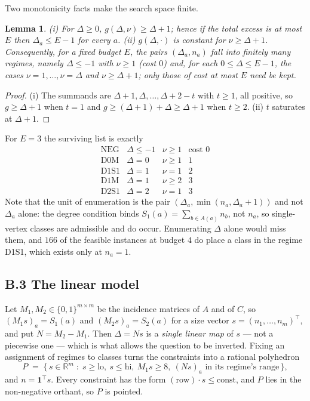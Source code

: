 \documentclass[11pt]{amsart}
\newtheorem{lemma}[theorem]{Lemma}
\theoremstyle{remark}
\begin{document}
Two monotonicity facts make the search space finite.

\begin{lemma}\label{lem:regimes}
(i) For $\Delta \ge 0$, $g(\Delta,\nu) \ge \Delta + 1$; hence if the total
excess is at most $E$ then $\Delta_a \le E - 1$ for every $a$. (ii)
$g(\Delta, \cdot)$ is constant for $\nu \ge \Delta+1$. Consequently, for a
fixed budget $E$, the pairs $(\Delta_a, n_a)$ fall into finitely many
\emph{regimes}, namely $\Delta \le -1$ with $\nu \ge 1$ (cost $0$) and, for
each $0 \le \Delta \le E-1$, the cases $\nu = 1, \dots, \nu = \Delta$ and
$\nu \ge \Delta+1$; only those of cost at most $E$ need be kept.
\end{lemma}

\begin{proof}
(i) The summands are $\Delta+1, \Delta, \dots, \Delta+2-t$ with $t \ge 1$, all
positive, so $g \ge \Delta+1$ when $t = 1$ and $g \ge (\Delta+1)+\Delta \ge
\Delta+1$ when $t \ge 2$. (ii) $t$ saturates at $\Delta+1$.
\end{proof}

For $E = 3$ the surviving list is exactly
\[
\begin{array}{llll}
\text{NEG} & \Delta \le -1 & \nu \ge 1 & \text{cost } 0\\
\text{D0M} & \Delta = 0 & \nu \ge 1 & 1\\
\text{D1S1} & \Delta = 1 & \nu = 1 & 2\\
\text{D1M} & \Delta = 1 & \nu \ge 2 & 3\\
\text{D2S1} & \Delta = 2 & \nu = 1 & 3
\end{array}
\]
Note that the unit of enumeration is the pair
$(\Delta_a, \min(n_a, \Delta_a+1))$ and not $\Delta_a$ alone: the degree
condition binds $S_1(a) = \sum_{b \in A(a)} n_b$, not $n_a$, so single-vertex
classes are admissible and do occur. Enumerating $\Delta$ alone would miss
them, and $166$ of the feasible instances at budget $4$ do place a class in the
regime D1S1, which exists only at $n_a = 1$.

\subsection*{B.3 The linear model}

Let $M_1, M_2 \in \{0,1\}^{m \times m}$ be the incidence matrices of $A$ and
of $C$, so $(M_1 s)_a = S_1(a)$ and $(M_2 s)_a = S_2(a)$ for a size vector
$s = (n_1,\dots,n_m)^{\!\top}$, and put $N = M_2 - M_1$. Then
$\Delta = N s$ is a \emph{single linear map} of $s$ --- not a piecewise one ---
which is what allows the question to be inverted. Fixing an assignment of
regimes to classes turns the constraints into a rational polyhedron
\[
P \;=\; \{\, s \in \mathbb{R}^m \;:\; s \ge \mathrm{lo},\ s \le \mathrm{hi},\
   M_1 s \ge 8,\ (Ns)_a \text{ in its regime's range} \,\},
\]
and $n = \mathbf{1}^{\!\top} s$. Every constraint has the form
$(\text{row}) \cdot s \le \text{const}$, and $P$ lies in the non-negative
orthant, so $P$ is pointed.
\end{document}
